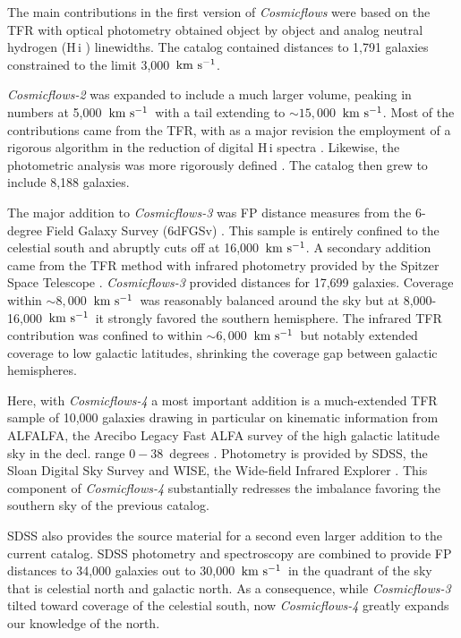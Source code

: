 \documentclass[twocolumn]{aastex63}
\newcommand{\kms}{\mbox{${\rm km~s^{-1}}$}}
\newcommand{\hi}{H{\sc\,i} }
\begin{document}
The main contributions in the first version of {\it Cosmicflows} \citep{2008ApJ...676..184T} were based on the TFR with optical photometry obtained object by object and analog neutral hydrogen (\hi) linewidths.  The catalog contained  distances to 1,791 galaxies constrained to the limit 3,000~\kms.

{\it Cosmicflows-2} \citep{2013AJ....146...86T} was expanded to include a much larger volume, peaking in numbers at 5,000~\kms\ with a tail extending to $\sim15,000$~\kms.  Most of the contributions came from the TFR, with as a major revision the employment of a rigorous algorithm in the reduction of digital \hi spectra \citep{2009AJ....138.1938C, 2011MNRAS.414.2005C}.  Likewise, the photometric analysis was more rigorously defined \citep{2011MNRAS.415.1935C, 2012AJ....144..133S}.  The catalog then grew to include 8,188 galaxies.

The major addition to {\it Cosmicflows-3} \citep{2016AJ....152...50T} was FP distance measures from the 6-degree Field Galaxy Survey (6dFGSv) \citep{2014MNRAS.445.2677S}.  This sample is entirely confined to the celestial south and abruptly cuts off at 16,000~\kms.  A secondary addition came from the TFR method with infrared photometry provided by the Spitzer Space Telescope \citep{2014MNRAS.444..527S}.  {\it Cosmicflows-3} provided distances for 17,699 galaxies.  Coverage within $\sim8,000$~\kms\ was reasonably balanced around the sky but at 8,000-16,000~\kms\ it strongly favored the southern hemisphere.  The infrared TFR contribution was confined to within $\sim6,000$~\kms\ but notably extended coverage to low galactic latitudes, shrinking the coverage gap between galactic hemispheres.

Here, with {\it Cosmicflows-4} a most important addition is a much-extended TFR sample of 10,000 galaxies drawing in particular on kinematic information from ALFALFA, the Arecibo Legacy Fast ALFA survey of the high galactic latitude sky in the decl. range $0 - 38$~degrees \citep{2011AJ....142..170H, 2018ApJ...861...49H}.  Photometry is provided by SDSS, the Sloan Digital Sky Survey \citep{2000AJ....120.1579Y} and WISE, the Wide-field Infrared Explorer \citep{2010AJ....140.1868W}.  This component of {\it Cosmicflows-4} substantially redresses the imbalance favoring the southern sky of the previous catalog.

SDSS also provides the source material for a second even larger addition to the current catalog.  SDSS photometry and spectroscopy are combined to provide FP distances to 34,000 galaxies out to 30,000~\kms\ in the quadrant of the sky that is celestial north and galactic north.  As a consequence, while {\it Cosmicflows-3} tilted toward coverage of the celestial south, now {\it Cosmicflows-4} greatly expands our knowledge of the north.
\end{document}
